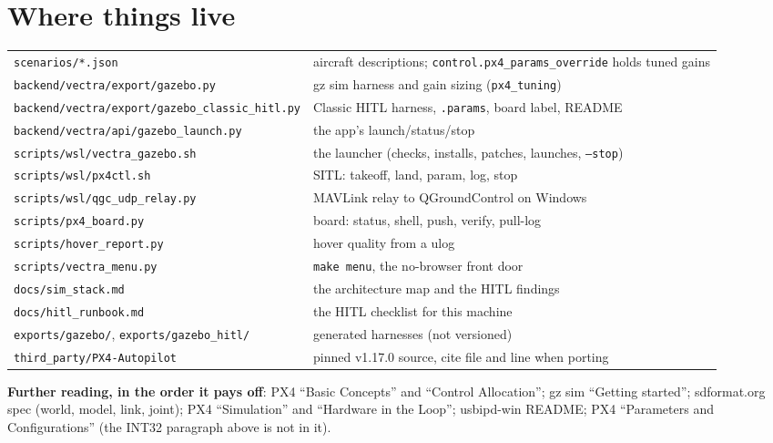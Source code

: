 \documentclass[11pt,a4paper]{article}
\newcommand{\file}[1]{\texttt{#1}}
\newcommand{\param}[1]{\texttt{#1}}
\begin{document}
\section{Where things live}

\begin{tabular}{@{}p{5.2cm}p{9.6cm}@{}}
\toprule
\file{scenarios/*.json} & aircraft descriptions; \param{control.px4\_params\_override} holds tuned gains \\
\file{backend/vectra/export/gazebo.py} & gz sim harness and gain sizing (\file{px4\_tuning}) \\
\file{backend/vectra/export/gazebo\_classic\_hitl.py} & Classic HITL harness, \file{.params}, board label, README \\
\file{backend/vectra/api/gazebo\_launch.py} & the app's launch/status/stop \\
\file{scripts/wsl/vectra\_gazebo.sh} & the launcher (checks, installs, patches, launches, \file{--stop}) \\
\file{scripts/wsl/px4ctl.sh} & SITL: takeoff, land, param, log, stop \\
\file{scripts/wsl/qgc\_udp\_relay.py} & MAVLink relay to QGroundControl on Windows \\
\file{scripts/px4\_board.py} & board: status, shell, push, verify, pull-log \\
\file{scripts/hover\_report.py} & hover quality from a ulog \\
\file{scripts/vectra\_menu.py} & \file{make menu}, the no-browser front door \\
\file{docs/sim\_stack.md} & the architecture map and the HITL findings \\
\file{docs/hitl\_runbook.md} & the HITL checklist for this machine \\
\file{exports/gazebo/}, \file{exports/gazebo\_hitl/} & generated harnesses (not versioned) \\
\file{third\_party/PX4-Autopilot} & pinned v1.17.0 source, cite file and line when porting \\
\bottomrule
\end{tabular}

\bigskip
\noindent\textbf{Further reading, in the order it pays off}: PX4 ``Basic Concepts'' and ``Control
Allocation''; gz sim ``Getting started''; sdformat.org spec (world, model, link, joint); PX4
``Simulation'' and ``Hardware in the Loop''; usbipd-win README; PX4 ``Parameters and
Configurations'' (the INT32 paragraph above is not in it).
\end{document}

